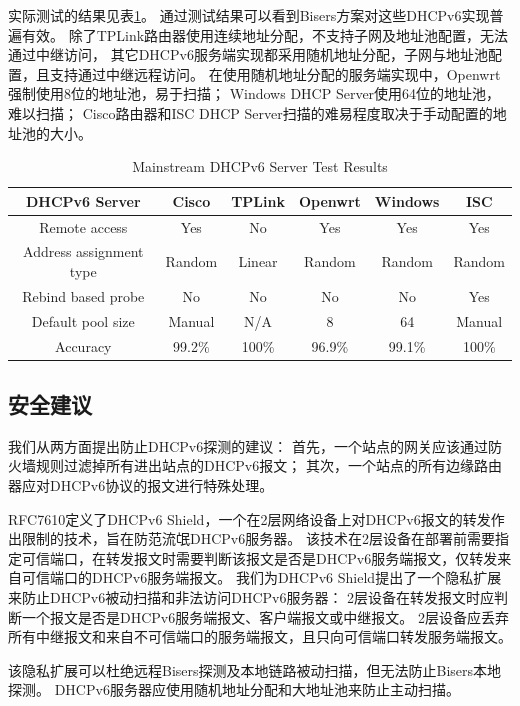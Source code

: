 \documentclass[UTF8]{article}
\begin{document}
实际测试的结果见表\ref{tabDHCPv6Server}。
通过测试结果可以看到Bisers方案对这些DHCPv6实现普遍有效。
除了TPLink路由器使用连续地址分配，不支持子网及地址池配置，无法通过中继访问，
其它DHCPv6服务端实现都采用随机地址分配，子网与地址池配置，且支持通过中继远程访问。
在使用随机地址分配的服务端实现中，Openwrt强制使用8位的地址池，易于扫描；
Windows DHCP Server使用64位的地址池，难以扫描；
Cisco路由器和ISC DHCP Server扫描的难易程度取决于手动配置的地址池的大小。

\begin{table}[htbp]
  \caption{Mainstream DHCPv6 Server Test Results}
  \label{tabDHCPv6Server}
  \centering
  \begin{tabular}{|c|c|c|c|c|c|}
    \hline
    DHCPv6 Server & Cisco & TPLink & Openwrt & Windows & ISC \\
    \hline
    Remote access & Yes & No & Yes & Yes & Yes \\
    Address assignment type & Random & Linear & Random & Random & Random \\
    Rebind based probe & No & No & No & No & Yes \\
    Default pool size & Manual & N/A & 8 & 64 & Manual \\
    Accuracy & 99.2\% & 100\% & 96.9\% & 99.1\% & 100\% \\
    \hline
  \end{tabular}
\end{table}

\subsection{安全建议}

我们从两方面提出防止DHCPv6探测的建议：
首先，一个站点的网关应该通过防火墙规则过滤掉所有进出站点的DHCPv6报文；
其次，一个站点的所有边缘路由器应对DHCPv6协议的报文进行特殊处理。

RFC7610定义了DHCPv6 Shield，一个在2层网络设备上对DHCPv6报文的转发作出限制的技术，旨在防范流氓DHCPv6服务器。
该技术在2层设备在部署前需要指定可信端口，在转发报文时需要判断该报文是否是DHCPv6服务端报文，仅转发来自可信端口的DHCPv6服务端报文。
我们为DHCPv6 Shield提出了一个隐私扩展来防止DHCPv6被动扫描和非法访问DHCPv6服务器：
2层设备在转发报文时应判断一个报文是否是DHCPv6服务端报文、客户端报文或中继报文。
2层设备应丢弃所有中继报文和来自不可信端口的服务端报文，且只向可信端口转发服务端报文。

该隐私扩展可以杜绝远程Bisers探测及本地链路被动扫描，但无法防止Bisers本地探测。
DHCPv6服务器应使用随机地址分配和大地址池来防止主动扫描。
\end{document}
